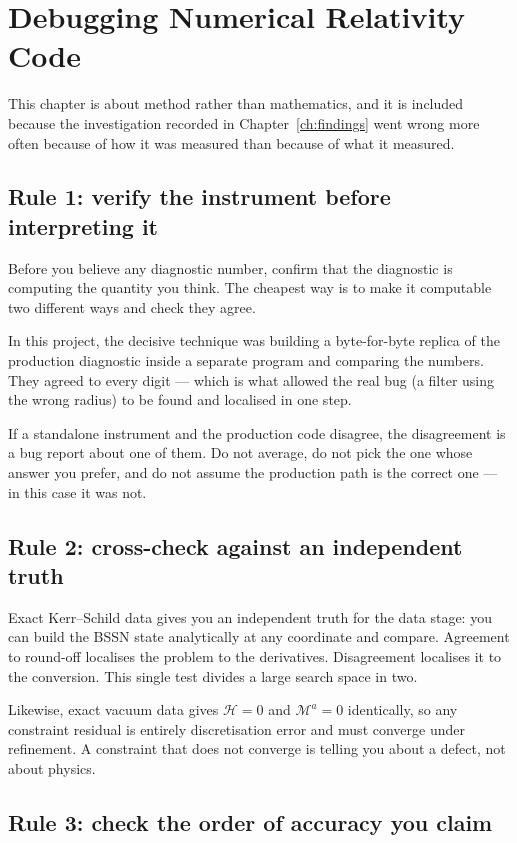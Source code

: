\documentclass[11pt,openany]{book}
\begin{document}
\chapter{Debugging Numerical Relativity Code}
\label{ch:debug}

This chapter is about method rather than mathematics, and it is included
because the investigation recorded in Chapter~\ref{ch:findings} went wrong
more often because of how it was measured than because of what it measured.

\section{Rule 1: verify the instrument before interpreting it}

Before you believe any diagnostic number, confirm that the diagnostic is
computing the quantity you think. The cheapest way is to make it computable
two different ways and check they agree.

In this project, the decisive technique was building a byte-for-byte replica of
the production diagnostic inside a separate program and comparing the numbers.
They agreed to every digit --- which is what allowed the real bug (a filter
using the wrong radius) to be found and localised in one step.

\gotcha
If a standalone instrument and the production code disagree, the disagreement
is a bug report about one of them. Do not average, do not pick the one whose
answer you prefer, and do not assume the production path is the correct one ---
in this case it was not.

\section{Rule 2: cross-check against an independent truth}

Exact Kerr--Schild data gives you an independent truth for the data stage: you
can build the BSSN state analytically at any coordinate and compare. Agreement
to round-off localises the problem to the derivatives. Disagreement localises
it to the conversion. This single test divides a large search space in two.

Likewise, exact vacuum data gives $\mathcal{H} = 0$ and $\mathcal{M}^a = 0$
identically, so any constraint residual is entirely discretisation error and
must converge under refinement. A constraint that does not converge is telling
you about a defect, not about physics.

\section{Rule 3: check the order of accuracy you claim}
\end{document}
